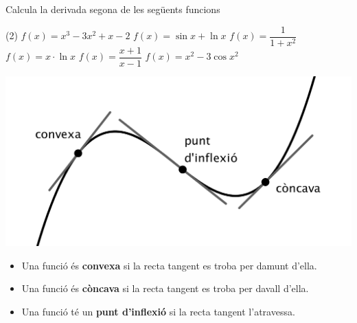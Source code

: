 \begin{mylist}
	\begin{noexerbreak}
		
	\exer Calcula la derivada segona de les següents funcions
	\begin{tasks}(2)
		\task $f(x)=x^3-3x^2+x-2$
		\task $f(x)=\sin x + \ln x$
		\task $f(x)=\dfrac{1}{1+x^2}$
		\task $f(x)=x\cdot \ln x$
		\task $f(x)=\dfrac{x+1}{x-1}$
		\task $f(x)=x^2-3\cos x^2$
	\end{tasks}

	\answers{[$y''=6x-6$, $y''=-\sin x -\frac{1}{x^2}$, $y''=\dfrac{6x^2-2}{(x^2+1)^3}$, $y''=\dfrac{1}{x}$, $y''=\dfrac{4}{(x-1)^3}$, $y''=6\sin x^2 + 12 x^2 \cos x^2 + 2$]}

	\end{noexerbreak}
\end{mylist}

	\begin{theorybox}
			\begin{minipage}{0.4\textwidth}
				\includegraphics*[width=\textwidth]{img-07/curvatura.png}
			\end{minipage}
			\begin{minipage}{0.6\textwidth}
				\begin{itemize}
					\item Una funció és \textbf{convexa} si la recta tangent es troba per damunt d'ella.
					\item Una funció és \textbf{còncava} si la recta tangent es troba per davall d'ella.
					\item Una funció té un \textbf{punt d'inflexió} si la recta tangent l'atravessa.
				\end{itemize}
			\end{minipage}
	\end{theorybox}
	
